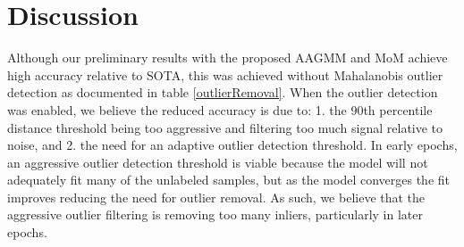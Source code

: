 \documentclass[10pt,twocolumn,letterpaper]{article}
\begin{document}
\section{Discussion}

Although our preliminary results with the proposed AAGMM and MoM achieve high accuracy relative to SOTA, this was achieved without Mahalanobis outlier detection as documented in table \ref{outlierRemoval}. 
When the outlier detection was enabled, we believe the reduced accuracy is due to: 1. the 90th percentile distance threshold being too aggressive and filtering too much signal relative to noise, and 2. the need for an adaptive outlier detection threshold. 
In early epochs, an aggressive outlier detection threshold is viable because the model will not adequately fit many of the unlabeled samples, but as the model converges the fit improves reducing the need for outlier removal.  As such, we believe that the aggressive outlier filtering is removing too many inliers, particularly in later epochs. 

\end{document}
